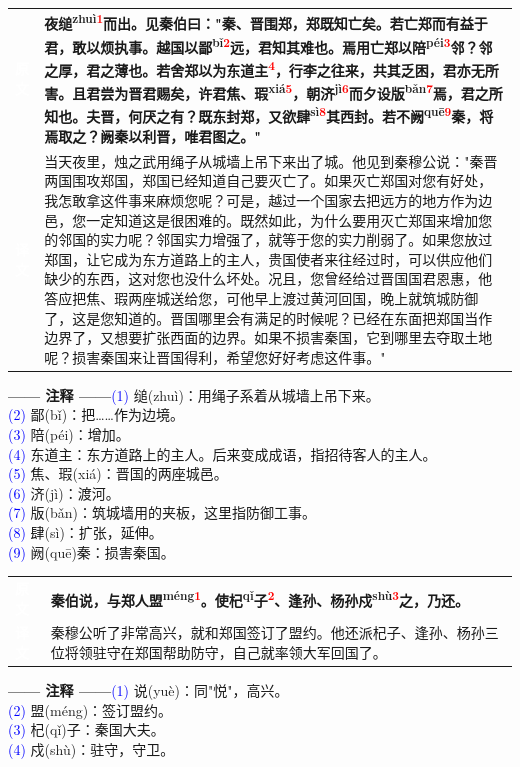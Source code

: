 \documentclass[a4paper,12pt]{ctexart}
\makeatletter
\newcommand{\ruby}[2]{#1\textsuperscript{#2}}
\newlength{\colA}\setlength{\colA}{0.06\textwidth}
\newlength{\colB}\setlength{\colB}{0.64\textwidth}
\newlength{\colC}\setlength{\colC}{0.26\textwidth}
\newcommand{\sectab}[3]{%
  \noindent
  \begin{minipage}[c]{\dimexpr\colA+\colB+2\tabcolsep\relax}
  \begin{tabular}{@{}p{\colA}p{\colB}@{}}
  \sideyuan  & {\large\bfseries #1} \\
  \sideyiwen & {\large #2} \\
  \end{tabular}
  \end{minipage}
  \hfill
  \begin{minipage}[c]{\colC}
  {\labelann\vspace{0.1cm}}#3
  \end{minipage}
  \par
}
\newcommand{\sideyuan}{\colorbox{blue!70!black}{\textcolor{white}{\normalsize\textbf{原文}}}}
\newcommand{\sideyiwen}{\colorbox{green!60!black}{\textcolor{white}{\normalsize\textbf{译文}}}}
\newcommand{\labelann}{\textcolor{orange!80!black}{\small\textbf{—— 注释 ——}}}
\newcommand{\refmark}[1]{\textsuperscript{\textcolor{red}{#1}}}
\makeatother
\begin{document}
\vspace{0.3cm}
\sectab{夜\ruby{缒}{zhuì}\refmark{1}而出。见秦伯曰："秦、晋围郑，郑既知亡矣。若亡郑而有益于君，敢以烦执事。越国以\ruby{鄙}{bǐ}\refmark{2}远，君知其难也。焉用亡郑以\ruby{陪}{péi}\refmark{3}邻？邻之厚，君之薄也。若舍郑以为东道主\refmark{4}，行李之往来，共其乏困，君亦无所害。且君尝为晋君赐矣，许君焦、\ruby{瑕}{xiá}\refmark{5}，朝\ruby{济}{jì}\refmark{6}而夕设\ruby{版}{bǎn}\refmark{7}焉，君之所知也。夫晋，何厌之有？既东封郑，又欲\ruby{肆}{sì}\refmark{8}其西封。若不\ruby{阙}{quē}\refmark{9}秦，将焉取之？阙秦以利晋，唯君图之。"}{当天夜里，烛之武用绳子从城墙上吊下来出了城。他见到秦穆公说："秦晋两国围攻郑国，郑国已经知道自己要灭亡了。如果灭亡郑国对您有好处，我怎敢拿这件事来麻烦您呢？可是，越过一个国家去把远方的地方作为边邑，您一定知道这是很困难的。既然如此，为什么要用灭亡郑国来增加您的邻国的实力呢？邻国实力增强了，就等于您的实力削弱了。如果您放过郑国，让它成为东方道路上的主人，贵国使者来往经过时，可以供应他们缺少的东西，这对您也没什么坏处。况且，您曾经给过晋国国君恩惠，他答应把焦、瑕两座城送给您，可他早上渡过黄河回国，晚上就筑城防御了，这是您知道的。晋国哪里会有满足的时候呢？已经在东面把郑国当作边界了，又想要扩张西面的边界。如果不损害秦国，它到哪里去夺取土地呢？损害秦国来让晋国得利，希望您好好考虑这件事。"}{{\small \textcolor{blue}{(1)} 缒(zhuì)：用绳子系着从城墙上吊下来。}\\[0.1cm]{\small \textcolor{blue}{(2)} 鄙(bǐ)：把……作为边境。}\\[0.1cm]{\small \textcolor{blue}{(3)} 陪(péi)：增加。}\\[0.1cm]{\small \textcolor{blue}{(4)} 东道主：东方道路上的主人。后来变成成语，指招待客人的主人。}\\[0.1cm]{\small \textcolor{blue}{(5)} 焦、瑕(xiá)：晋国的两座城邑。}\\[0.1cm]{\small \textcolor{blue}{(6)} 济(jì)：渡河。}\\[0.1cm]{\small \textcolor{blue}{(7)} 版(bǎn)：筑城墙用的夹板，这里指防御工事。}\\[0.1cm]{\small \textcolor{blue}{(8)} 肆(sì)：扩张，延伸。}\\[0.1cm]{\small \textcolor{blue}{(9)} 阙(quē)秦：损害秦国。}}

\vspace{0.3cm}
\sectab{秦伯说，与郑人\ruby{盟}{méng}\refmark{1}。使\ruby{杞}{qǐ}子\refmark{2}、逢孙、杨孙\ruby{戍}{shù}\refmark{3}之，乃还。}{秦穆公听了非常高兴，就和郑国签订了盟约。他还派杞子、逢孙、杨孙三位将领驻守在郑国帮助防守，自己就率领大军回国了。}{{\small \textcolor{blue}{(1)} 说(yuè)：同"悦"，高兴。}\\[0.1cm]{\small \textcolor{blue}{(2)} 盟(méng)：签订盟约。}\\[0.1cm]{\small \textcolor{blue}{(3)} 杞(qǐ)子：秦国大夫。}\\[0.1cm]{\small \textcolor{blue}{(4)} 戍(shù)：驻守，守卫。}}
\end{document}
